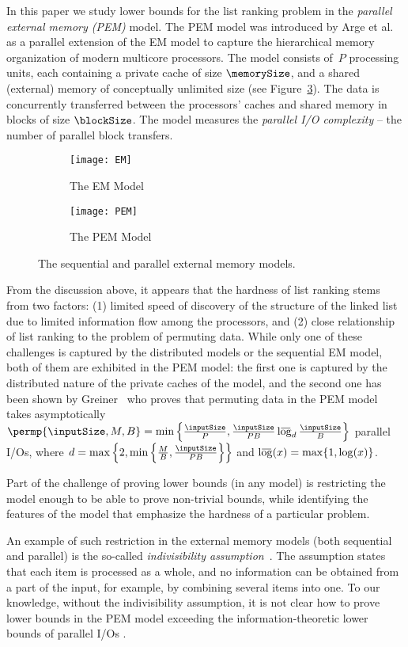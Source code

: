 \documentclass[envcountsame]{llncs}
\newcommand{\lgb}{\mathop{\mathrm{l\hbox to 0pt{\kern .05em $\overline{\vbox to 1.1ex{\hbox to .85em {~}}}$\hss}og}}\nolimits}
\def\bOm#1{\printmath{\Omega \left(#1\right)}}
\begin{document}
In this paper we study lower bounds for the list ranking problem in the {\em parallel external memory (PEM)} model. 
The PEM model was introduced by Arge et al.~\cite{2008ArgeEtAlFundamentalPEM} as a parallel extension of the EM model to capture the hierarchical memory organization of modern multicore processors. 
The model consists of~$P$ processing units, each containing a private cache of size $\memorySize$, and a shared (external) memory of conceptually unlimited size (see Figure~\ref{figurePEMmodel}). 
The data is concurrently transferred between the processors' caches and shared memory in blocks of size $\blockSize$. 
The model measures the {\em parallel I/O complexity} -- the number of parallel block transfers. 
\begin{figure}[tb]
\centering
\begin{subfigure}{.3\textwidth}
\texttt{[image: EM]}
\caption{The EM Model}
\label{figureEMmodel}
\end{subfigure}
\begin{subfigure}{.69\textwidth}
\texttt{[image: PEM]}
\caption{The PEM Model}
\label{figurePEMmodel}
\end{subfigure}
\caption{The sequential and parallel external memory models.}
\end{figure}
From the discussion above, it appears that the hardness of list ranking stems from two factors: (1) limited speed of discovery of the structure of the linked list due to limited information flow among the processors,
and (2) close relationship of list ranking to the problem of permuting data. 
While only one of these challenges is captured by the distributed models or the sequential EM model, both of them are exhibited in the PEM model: the first one is captured by the distributed nature of the private caches of the model, and the second one has been shown by Greiner~\cite{2012ThesisGero} who proves that permuting data in the PEM model takes asymptotically $\permp{\inputSize,M,B} = \min\left\{\frac{{\inputSize}}{P},\frac{\inputSize}{PB}\lgb_d\frac{\inputSize}{B}\right\}$ parallel I/Os, where $d=\max\left\{2,\min\left\{\frac{M}{B},\frac{\inputSize}{PB}\right\}\right\}$ and $\lgb(x) = \max\{1, \log(x)\}$.

Part of the challenge of proving lower bounds (in any model) is restricting the model enough to be able to prove non-trivial bounds, while identifying the features of the model that emphasize the hardness of a particular problem. 

An example of such restriction in the external memory models (both sequential and parallel) is the so-called {\em indivisibility assumption}~\cite{1988AggarwalVitterEM}. 
The assumption states that each item is processed as a whole, and no information can be obtained from a part of the input, for example, by combining  several items into one. 
To our knowledge, without the indivisibility assumption, it is not clear how to prove lower bounds in the PEM model exceeding the information-theoretic lower bounds of \bOm{\log P} parallel I/Os \cite{1990KarpRamachandranPRAMListRankLB,2008ArgeEtAlFundamentalPEM}.  
\end{document}
